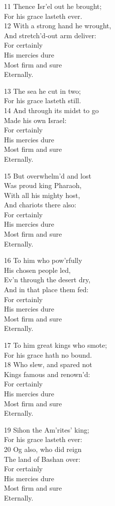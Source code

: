 11 Thence Isr’el out he brought;\\
For his grace lasteth ever.\\
12 With a strong hand he wrought,\\
And stretch’d-out arm deliver:\\
For certainly\\
His mercies dure\\
Most firm and sure\\
Eternally.

13 The sea he cut in two;\\
For his grace lasteth still.\\
14 And through its midst to go\\
Made his own Israel:\\
For certainly\\
His mercies dure\\
Most firm and sure\\
Eternally.

15 But overwhelm’d and lost\\
Was proud king Pharaoh,\\
With all his mighty host,\\
And chariots there also:\\
For certainly\\
His mercies dure\\
Most firm and sure\\
Eternally.

16 To him who pow’rfully\\
His chosen people led,\\
Ev’n through the desert dry,\\
And in that place them fed:\\
For certainly\\
His mercies dure\\
Most firm and sure\\
Eternally.

17 To him great kings who smote;\\
For his grace hath no bound.\\
18 Who slew, and spared not\\
Kings famous and renown’d:\\
For certainly\\
His mercies dure\\
Most firm and sure\\
Eternally.

19 Sihon the Am’rites’ king;\\
For his grace lasteth ever:\\
20 Og also, who did reign\\
The land of Bashan over:\\
For certainly\\
His mercies dure\\
Most firm and sure\\
Eternally.

